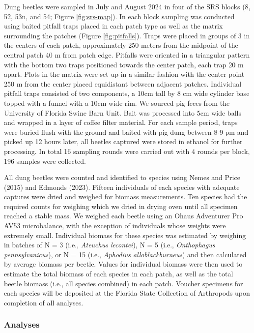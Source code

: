 \documentclass[
  man, donotrepeattitle]{apa6}
\begin{document}
Dung beetles were sampled in July and August 2024 in four of the SRS blocks (8, 52, 53n, and 54; Figure \ref{fig:srs-map}). In each block sampling was conducted using baited pitfall traps placed in each patch type as well as the matrix surrounding the patches (Figure \ref{fig:pitfalls}). Traps were placed in groups of 3 in the centers of each patch, approximately 250 meters from the midpoint of the central patch 40 m from patch edge. Pitfalls were oriented in a triangular pattern with the bottom two traps positioned towards the center patch, each trap 20 m apart. Plots in the matrix were set up in a similar fashion with the center point 250 m from the center placed equidistant between adjacent patches. Individual pitfall traps consisted of two components, a 10cm tall by 8 cm wide cylinder base topped with a funnel with a 10cm wide rim. We sourced pig feces from the University of Florida Swine Barn Unit. Bait was processed into 5cm wide balls and wrapped in a layer of coffee filter material. For each sample period, traps were buried flush with the ground and baited with pig dung between 8-9 pm and picked up 12 hours later, all beetles captured were stored in ethanol for further processing. In total 16 sampling rounds were carried out with 4 rounds per block, 196 samples were collected.

All dung beetles were counted and identified to species using Nemes and Price (2015) and Edmonds (2023). Fifteen individuals of each species with adequate captures were dried and weighed for biomass measurements. Ten species had the required counts for weighing which we dried in drying oven until all specimen reached a stable mass. We weighed each beetle using an Ohaus Adventurer Pro AV53 microbalance, with the exception of individuals whose weights were extremely small. Individual biomass for these species was estimated by weighing in batches of N = 3 (i.e., \emph{Ateuchus lecontei}), N = 5 (i.e., \emph{Onthophagus pennsylvanicus}), or N = 15 (i.e., \emph{Aphodius alloblackburneus}) and then calculated by average biomass per beetle. Values for individual biomass were then used to estimate the total biomass of each species in each patch, as well as the total beetle biomass (i.e., all species combined) in each patch. Voucher specimens for each species will be deposited at the Florida State Collection of Arthropods upon completion of all analyses.

\subsubsection{Analyses}\label{analyses}
\end{document}
